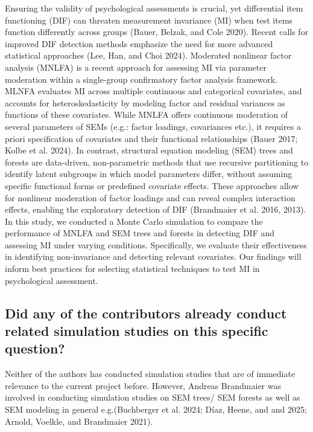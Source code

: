 \documentclass[
  man,
  floatsintext]{apa7}
\begin{document}
Ensuring the validity of psychological assessments is crucial, yet
differential item functioning (DIF) can threaten measurement invariance
(MI) when test items function differently across groups (Bauer, Belzak,
and Cole 2020). Recent calls for improved DIF detection methods
emphasize the need for more advanced statistical approaches (Lee, Han,
and Choi 2024). Moderated nonlinear factor analysis (MNLFA) is a recent
approach for assessing MI via parameter moderation within a single-group
confirmatory factor analysis framework. MLNFA evaluates MI across
multiple continuous and categorical covariates, and accounts for
heteroskedasticity by modeling factor and residual variances as
functions of these covariates. While MNLFA offers continuous moderation
of several parameters of SEMs (e.g.: factor loadings, covariances etc.),
it requires a priori specification of covariates and their functional
relationships (Bauer 2017; Kolbe et al. 2024). In contrast, structural
equation modeling (SEM) trees and forests are data-driven,
non-parametric methods that use recursive partitioning to identify
latent subgroups in which model parameters differ, without assuming
specific functional forms or predefined covariate effects. These
approaches allow for nonlinear moderation of factor loadings and can
reveal complex interaction effects, enabling the exploratory detection
of DIF (Brandmaier et al. 2016, 2013). In this study, we conducted a
Monte Carlo simulation to compare the performance of MNLFA and SEM trees
and forests in detecting DIF and assessing MI under varying conditions.
Specifically, we evaluate their effectiveness in identifying
non-invariance and detecting relevant covariates. Our findings will
inform best practices for selecting statistical techniques to test MI in
psychological assessment.

\subsection{Did any of the contributors already conduct related
simulation studies on this specific
question?}\label{did-any-of-the-contributors-already-conduct-related-simulation-studies-on-this-specific-question}

Neither of the authors has conducted simulation studies that are of
immediate relevance to the current project before. However, Andreas
Brandmaier was involved in conducting simulation studies on SEM trees/
SEM forests as well as SEM modeling in general e.g.(Buchberger et al.
2024; Díaz, Heene, and and 2025; Arnold, Voelkle, and Brandmaier 2021).
\end{document}
